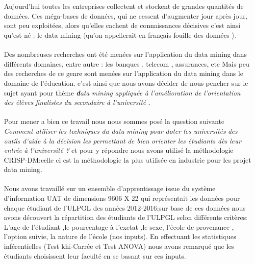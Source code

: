 \makeatletter
\renewenvironment{abstract}{%
	\if@twocolumn
	\section*{\abstractname}%
	\else %
	\begin{center}%
		{\bfseries\Large\textit {\abstractname}\vspace{\z@}}%
	\end{center}%
	\quotation
	\fi}
{\if@twocolumn\else\endquotation\fi}
\makeatother
{} 
\begin{abstract}
	\thispagestyle{plain} 
Aujourd'hui toutes les entreprises collectent et stockent de grandes quantités de données. Ces méga-bases de données, qui ne cessent d'augmenter jour après jour, sont peu exploitées, alors qu'elles cachent de connaissances décisives c'est ainsi qu'est né : le data mining   (qu'on appellerait en français fouille des données ).
\paragraph{}
Des nombreuses recherches ont été menées sur l'application du data mining dans différents domaines,  entre autre : les banques , telecom , assurances, etc
Mais peu des recherches de ce genre sont menées sur l'application du data mining dans le domaine de l'éducation. c'est ainsi que nous avons décider 
de nous pencher sur le sujet ayant pour thème \textit{ \textbf data mining appliquée à l’amélioration  de l'orientation des élèves finalistes du secondaire à l'université } .
\paragraph{}
Pour mener a bien ce travail nous nous sommes posé la question suivante \emph{Comment utiliser les techniques  du data mining pour doter les universités des outils d'aide à la décision les permettant de bien orienter les étudiants dès leur entrée à l'université ?  } et pour y répondre nous avons utilisé la méthodologie  \ac{CRISP-DM}:celle ci est la méthodologie la plus utilisée en industrie pour les projet data mining.
\paragraph{}
Nous avons travaillé sur un ensemble d'apprentissage issue du système d'information UAT de dimensions 9606 X 22 qui représentait les données pour chaque étudiant de l'ULPGL des années 2012-2016;sur base de ces données nous avons découvert la répartition des étudiants de l'ULPGL selon différents critères:  L'age de l'étudiant ,le pourcentage à l'exetat ,le sexe, l'école de provenance , l'option suivie, la nature de l'école  (nos inputs). 
En effectuant les statistiques inférentielles (Test khi-Carrée et Test ANOVA) nous avons remarqué que les étudiants choisissent leur faculté  en se basant sur ces inputs.

\end{abstract}
